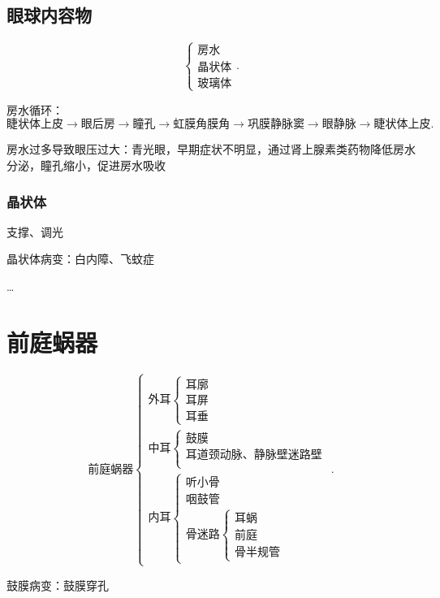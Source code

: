 \subsection{眼球内容物}%
\label{sub:眼球内容物}
\[
    \begin{cases}
        \text{房水}\\
        \text{晶状体}\\
        \text{玻璃体}
    \end{cases}
.\]
\begin{notation}
    房水循环：\[
        \text{睫状体上皮}\to \text{眼后房}\to \text{瞳孔}\to \text{虹膜角膜角}\to \text{巩膜静脉窦}\to \text{眼静脉}\to \text{睫状体上皮}
    .\]
\end{notation}
\begin{notation}
    房水过多导致眼压过大：青光眼，早期症状不明显，通过肾上腺素类药物降低房水分泌，瞳孔缩小，促进房水吸收
\end{notation}
\subsubsection*{晶状体}%
\label{subsub:晶状体}
支撑、调光
\begin{notation}
    晶状体病变：白内障、飞蚊症
\end{notation}
\ldots 
\section{前庭蜗器}%
\label{sec:前庭蜗器}
\[
    \text{前庭蜗器}\begin{cases}
        \text{外耳}\begin{cases}
            \text{耳廓}\\
            \text{耳屏}\\
            \text{耳垂}
        \end{cases}\\
        \text{中耳}\begin{cases}
            \text{鼓膜}\\
            \text{耳道}
            \text{颈动脉、静脉壁}
            \text{迷路壁}\\
        \end{cases}\\
        \text{内耳}\begin{cases}
            \text{听小骨}\\
            \text{咽鼓管}\\
            \text{骨迷路}\begin{cases}
                \text{耳蜗}\\
                \text{前庭}\\
                \text{骨半规管}
            \end{cases}
        \end{cases}
    \end{cases}
.\]
\begin{notation}
    鼓膜病变：鼓膜穿孔
\end{notation}
